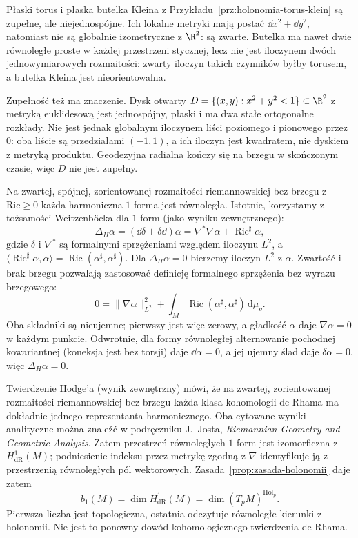 \begin{przyklad}
\label{prz:de-rham-zalozenia}
Płaski torus i płaska butelka Kleina z
Przykładu~\ref{prz:holonomia-torus-klein} są zupełne,
ale niejednospójne. Ich lokalne metryki mają postać
$\dd x^2+\dd y^2$, natomiast nie są globalnie
izometryczne z $\R^2$: są zwarte. Butelka ma nawet
dwie równoległe proste w każdej przestrzeni stycznej,
lecz nie jest iloczynem dwóch jednowymiarowych
rozmaitości: zwarty iloczyn takich czynników byłby
torusem, a butelka Kleina jest nieorientowalna.

Zupełność też ma znaczenie. Dysk otwarty
$D=\{(x,y):x^2+y^2<1\}\subset\R^2$ z metryką
euklidesową jest jednospójny, płaski i ma dwa stałe
ortogonalne rozkłady. Nie jest jednak globalnym
iloczynem liści poziomego i pionowego przez $0$:
oba liście są przedziałami $(-1,1)$, a ich iloczyn
jest kwadratem, nie dyskiem z metryką produktu.
Geodezyjna radialna kończy się na brzegu w skończonym
czasie, więc $D$ nie jest zupełny.
\end{przyklad}

\begin{uwaga}
\label{uwaga:holonomia-bochner}
Na zwartej, spójnej, zorientowanej rozmaitości
riemannowskiej bez brzegu z $\mathrm{Ric}\geq0$
każda harmoniczna $1$-forma jest równoległa. Istotnie,
korzystamy z tożsamości Weitzenböcka dla $1$-form
(jako wyniku zewnętrznego):
\[
 \Delta_H\alpha=(\dd\delta+\delta\dd)\alpha
 =\nabla^*\nabla\alpha+\operatorname{Ric}^\sharp\alpha ,
\]
gdzie $\delta$ i $\nabla^*$ są formalnymi sprzężeniami
względem iloczynu $L^2$, a
$\langle\operatorname{Ric}^\sharp\alpha,\alpha\rangle
 =\operatorname{Ric}(\alpha^\sharp,\alpha^\sharp)$.
Dla $\Delta_H\alpha=0$ bierzemy iloczyn $L^2$ z $\alpha$.
Zwartość i brak brzegu pozwalają zastosować definicję
formalnego sprzężenia bez wyrazu brzegowego:
\[
 0=\|\nabla\alpha\|_{L^2}^2+
   \int_M\operatorname{Ric}(\alpha^\sharp,\alpha^\sharp)
   \,\mathrm d\mu_g .
\]
Oba składniki są nieujemne; pierwszy jest więc zerowy,
a gładkość $\alpha$ daje $\nabla\alpha=0$ w każdym punkcie.
Odwrotnie, dla formy równoległej alternowanie pochodnej
kowariantnej (koneksja jest bez torsji) daje
$\dd\alpha=0$, a jej ujemny ślad daje $\delta\alpha=0$,
więc $\Delta_H\alpha=0$.

Twierdzenie Hodge'a (wynik zewnętrzny) mówi, że na
zwartej, zorientowanej rozmaitości riemannowskiej bez
brzegu każda klasa kohomologii de Rhama ma dokładnie
jednego reprezentanta harmonicznego. Oba cytowane
wyniki analityczne można znaleźć w podręczniku
J.~Josta, \emph{Riemannian Geometry and Geometric Analysis}.
Zatem przestrzeń równoległych $1$-form jest izomorficzna
z $H^1_{\mathrm{dR}}(M)$; podniesienie indeksu przez
metrykę zgodną z $\nabla$ identyfikuje ją z przestrzenią
równoległych pól wektorowych.
Zasada~\ref{prop:zasada-holonomii} daje zatem
\[
 b_1(M)=\dim H^1_{\mathrm{dR}}(M)
       =\dim (T_pM)^{\operatorname{Hol}_p}.
\]
Pierwsza liczba jest topologiczna, ostatnia odczytuje
równoległe kierunki z holonomii. Nie jest to ponowny
dowód kohomologicznego twierdzenia de Rhama.
\end{uwaga}

